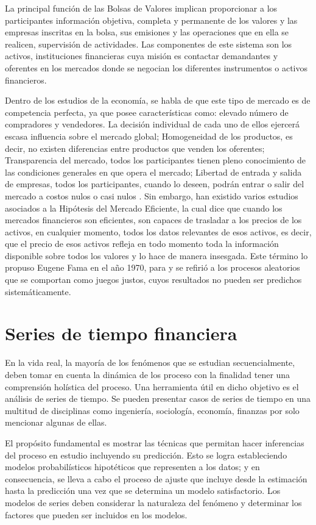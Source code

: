 La principal función de las Bolsas de Valores implican proporcionar a los participantes información objetiva, completa y permanente de los valores
y las empresas inscritas en la bolsa, sus emisiones y las operaciones que en ella se realicen, supervisión de actividades. Las componentes de este sistema 
son los activos, instituciones financieras cuya misión es contactar demandantes y oferentes en los mercados donde se negocian
los diferentes instrumentos o activos financieros.

Dentro de los estudios de la economía, se habla de que este tipo de mercado es de competencia perfecta, ya que posee características
como: elevado número de compradores y vendedores. La decisión individual de cada uno de ellos ejercerá escasa influencia sobre el mercado global; 
Homogeneidad de los productos, es decir, no existen diferencias entre productos que venden los oferentes; Transparencia del mercado, todos los 
participantes tienen pleno conocimiento de las condiciones generales en que opera el mercado; Libertad de entrada y salida de empresas, todos 
los participantes, cuando lo deseen, podrán entrar o salir del mercado a costos nulos o casi nulos \cite{mankiw2011principles}. Sin embargo, han existido
varios estudios asociados a la Hipótesis del Mercado Eficiente, la cual dice que cuando los mercados financieros son eficientes, son capaces de trasladar 
a los precios de los activos, en cualquier momento, todos los datos relevantes de esos activos, es decir, que el precio de esos activos 
refleja en todo momento toda la información disponible sobre todos los valores y lo hace de manera insesgada. Este término lo propuso Eugene Fama en el año
1970, para y se refirió a los procesos aleatorios que se comportan como juegos justos, cuyos resultados no pueden ser predichos sistemáticamente.

\section{Series de tiempo financiera}

En la vida real, la mayoría de los fenómenos que se estudian secuencialmente, deben
tomar en cuenta la dinámica de los proceso con la finalidad tener una comprensión holística del proceso.
Una herramienta útil en dicho objetivo es el análisis de series de tiempo. Se
pueden presentar casos de series de tiempo en una multitud de disciplinas como ingeniería,
sociología, economía, finanzas por solo mencionar algunas de ellas.

El propósito fundamental es mostrar las técnicas que permitan hacer inferencias del
proceso en estudio incluyendo su predicción. Esto se logra estableciendo modelos
probabilísticos hipotéticos que representen a los datos; y en consecuencia, se lleva a cabo el
proceso de ajuste que incluye desde la estimación hasta la predicción una vez que se determina
un modelo satisfactorio. Los modelos de series deben considerar la naturaleza del fenómeno y determinar 
los factores que pueden ser incluidos en los modelos.

